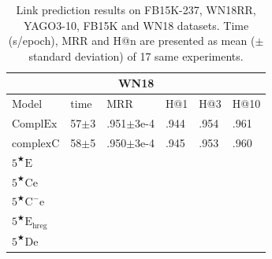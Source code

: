 \documentclass[11pt]{article}
\begin{document}
\begin{table}

\begin{tabular}{llllll}
    \hline
    \multicolumn{6}{c}{WN18}\\
    \hline
    Model & time & MRR & H@1 & H@3 & H@10\\
    \hline
    $\mathrm{ComplEx}$ & 57$\pm$3 & .951$\pm$3e-4 & .944 & .954 & .961\\
    $\mathrm{complexC}$ & 58$\pm$5 & .950$\pm$3e-4 & .945 & .953 & .960\\
    $5^{\bigstar}\mathrm{E}$ &\\
    $5^{\bigstar}\mathrm{Ce}$ &\\
    $5^{\bigstar}\mathrm{C^{-}e}$ &\\
    $5^{\bigstar}\mathrm{E_{hreg}}$ & \\
    $5^{\bigstar}\mathrm{De}$ &&&&\\
    \hline
\end{tabular}
\caption{
Link prediction results on FB15K-237, WN18RR, YAGO3-10, FB15K and WN18 datasets.
Time (s/epoch), MRR and H@n are presented as mean ($\pm$ standard deviation) of 17 same experiments.
}
\label{mrrs}
\end{table}
\end{document}
